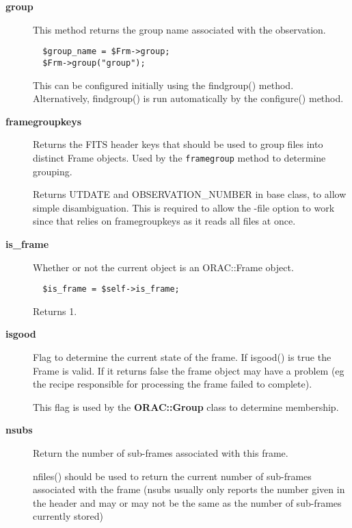 \begin{description}

\item[{\textbf{group}}] \mbox{}

This method returns the group name associated with the observation.

\begin{verbatim}
  $group_name = $Frm->group;
  $Frm->group("group");
\end{verbatim}


This can be configured initially using the findgroup() method.
Alternatively, findgroup() is run automatically by the configure()
method.


\item[{\textbf{framegroupkeys}}] \mbox{}

Returns the FITS header keys that should be used to group
files into distinct Frame objects. Used by the \texttt{framegroup}
method to determine grouping.



Returns UTDATE and OBSERVATION\_NUMBER in base class, to allow
simple disambiguation. This is required to allow the -file
option to work since that relies on framegroupkeys as it
reads all files at once.


\item[{\textbf{is\_frame}}] \mbox{}

Whether or not the current object is an ORAC::Frame object.

\begin{verbatim}
  $is_frame = $self->is_frame;
\end{verbatim}


Returns 1.


\item[{\textbf{isgood}}] \mbox{}

Flag to determine the current state of the frame. If isgood() is true
the Frame is valid. If it returns false the frame object may have a
problem (eg the recipe responsible for processing the frame failed to
complete).



This flag is used by the \textbf{ORAC::Group} class to determine membership.


\item[{\textbf{nsubs}}] \mbox{}

Return the number of sub-frames associated with this frame.



nfiles() should be used to return the current number of sub-frames
associated with the frame (nsubs usually only reports the number given
in the header and may or may not be the same as the number of
sub-frames currently stored)




\end{description}
